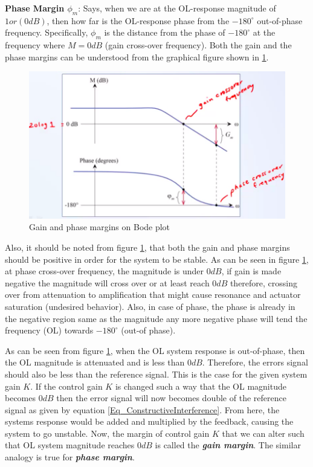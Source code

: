 \textbf{Phase Margin $\phi_m$}: Says, when we are at the OL-response magnitude of $1 or (0 dB)$, then how far is the OL-response phase from the $-180^{\circ}$ out-of-phase frequency.
Specifically, $\phi_m$ is the distance from the phase of $-180^{\circ}$ at the frequency where $M = 0 dB$ (gain cross-over frequency). Both the gain and the phase margins can be understood from the graphical figure shown in \ref{Fig_FrequencyResponse_GainAndPhaseMargins}.
\begin{figure}[h!]
	\centering
	\includegraphics[width=\linewidth]{Bilder/FrequencyResp_GainAndPahseMArgins}
	\caption{Gain and phase margins on Bode plot}
	\label{Fig_FrequencyResponse_GainAndPhaseMargins}
\end{figure}

Also, it should be noted from figure \ref{Fig_FrequencyResponse_GainAndPhaseMargins}, that both the gain and phase margins should be positive in order for the system to be stable. As can be seen in figure \ref{Fig_FrequencyResponse_GainAndPhaseMargins}, at phase cross-over frequency, the magnitude is under $0 dB$, if gain is made negative the magnitude will cross over or at least reach $0 dB$ therefore, crossing over from attenuation to amplification that might cause resonance and actuator saturation (undesired behavior). Also, in case of phase, the phase is already in the negative region same as the magnitude any more negative phase will tend the frequency (OL) towards $-180^{\circ}$ (out-of phase).

As can be seen from figure \ref{Fig_FrequencyResponse_GainAndPhaseMargins}, when the OL system response is out-of-phase, then the OL magnitude is attenuated and is less than $0 dB$. Therefore, the errors signal should also be less than the reference signal. This is the case for the given system gain $K$. If the control gain $K$ is changed such a way that the OL magnitude becomes $0 dB$ then the error signal will now becomes double of the reference signal as given by equation \eqref{Eq_ConstructiveInterference}. From here, the systems response would be added and multiplied by the feedback, causing the system to go unstable. Now, the margin of control gain $K$ that we can alter such that OL system magnitude reaches $0 dB$ is called the \textbf{\textit{gain margin}}. The similar analogy is true for \textbf{\textit{phase margin}}.

